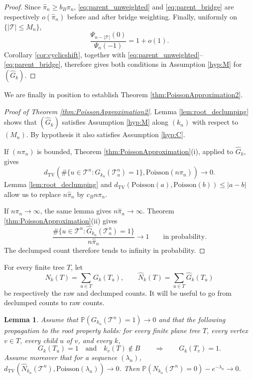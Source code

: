 \documentclass[a4paper,11pt]{article}
\newtheorem{lemma}[theorem]{Lemma}
\DeclareRobustCommand{\P}{\mathbb{P}}
\DeclareRobustCommand{\1}{\mathbf{1}}
\newcommand{\dTV}{d_{\mathrm{TV}}}
\newcommand{\Po}{\mathrm{Poisson}}
\begin{document}
\begin{proof}
Since $\widehat\pi_n\ge b_B\pi_n$, \eqref{eq:parent_unweighted} and
\eqref{eq:parent_bridge} are respectively
$o(\widehat\pi_n)$ before and after bridge weighting. Finally, uniformly on
$\{|\mathcal T|\le M_n\}$,
$$
\frac{\Psi_{n-|\mathcal T|}(0)}{\Psi_n(-1)}=1+o(1).
$$
Corollary \ref{cor:cyclicshift}, together with
\eqref{eq:parent_unweighted}--\eqref{eq:parent_bridge}, therefore gives
both conditions in Assumption \ref{hyp:M} for $(\widehat G_k)$.
\end{proof}
  
 

We are finally in position to establish Theorem \ref{thm:PoissonApproximation2}.

\begin{proof}[Proof of Theorem \ref{thm:PoissonApproximation2}]
Lemma \ref{lem:root_declumping} shows that $(\widehat G_k)$ satisfies
Assumption \ref{hyp:M} along $(k_n)$ with respect to $(M_n)$. By hypothesis
it also satisfies Assumption \ref{hyp:C}.

If $(n\pi_n)$ is bounded, Theorem
\ref{thm:PoissonApproximation}\textup{(i)}, applied to $\widehat G_k$, gives
$$
\dTV\left(
\#\{u\in\mathcal T^n:\widehat G_{k_n}(\mathcal T_u^n)=1\},
\Po(n\widehat\pi_n)\right)\longrightarrow0.
$$
Lemma \ref{lem:root_declumping} and
$\dTV(\Po(a),\Po(b))\le|a-b|$ allow us to replace
$n\widehat\pi_n$ by $c_Bn\pi_n$.

If $n\pi_n\to\infty$, the same lemma gives
$n\widehat\pi_n\to\infty$.  Theorem \ref{thm:PoissonApproximation}\textup{(ii)} gives
$$
\frac{\#\{u\in\mathcal T^n:
\widehat G_{k_n}(\mathcal T_u^n)=1\}}{n\widehat\pi_n}
\longrightarrow1
\qquad\text{in probability}.
$$
The declumped count therefore tends to infinity in probability.
\end{proof}


For every finite tree $T$, let
$$
N_k(T)=\sum_{u\in T}G_k(T_u),
\qquad
\widehat{N}_k(T)=\sum_{u\in T}\widehat{G}_k(T_u)
$$
be respectively the raw and declumped counts. It will be useful to go from declumped counts to raw counts.



\begin{lemma}
\label{lem:declump_to_raw}
Assume that $\P(G_{k_n}(\mathcal T^n)=1)\to0$ and that the following
propagation to the root property holds: for every finite plane tree $T$, every
vertex $v\in T$, every child $u$ of $v$, and every $k$,
$$
G_k(T_u)=1
\quad\textrm{and}\quad
k_v(T)\notin B
\qquad\Longrightarrow\qquad
G_k(T_v)=1.
$$
Assume moreover that for a sequence $(\lambda_{n})$, $\dTV(\widehat{N}_{k_n}(\mathcal T^n),\Po(\lambda_n))\to0$.
Then $\P(N_{k_n}(\mathcal T^n)=0)-e^{-\lambda_n}\to0$.
\end{lemma}
\end{document}
